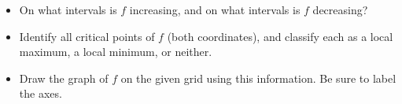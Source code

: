 \begin{itemize}
\item On what intervals is $f$ increasing, and on what intervals is $f$ decreasing?
\item Identify all critical points of $f$ (both coordinates), and classify each as a local maximum, a local minimum, or neither.
\item Draw the graph of $f$ on the given grid using this information.
 Be sure to label the axes.

\end{itemize}

\newpage
\GraphingGrid


